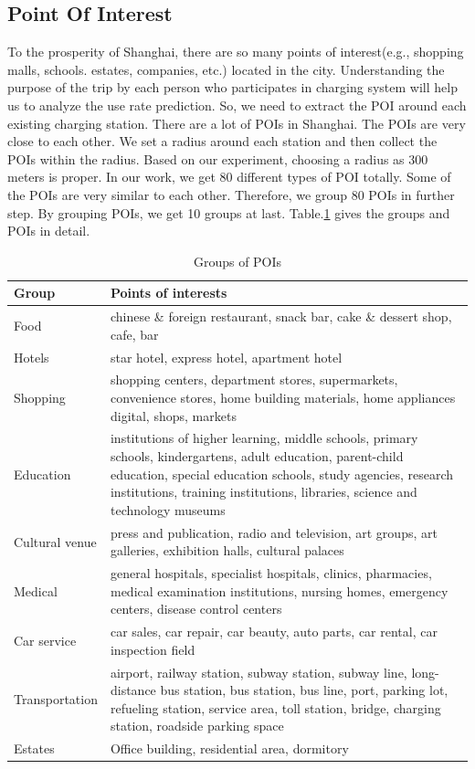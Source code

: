 \documentclass[conference]{IEEEtran}
\begin{document}
\subsection{Point Of Interest}
To the prosperity of Shanghai, there are so many points of interest(e.g., shopping malls, schools. estates, companies, etc.) located in the city.  Understanding the purpose of the trip by each person who participates in charging system will help us to analyze the use rate prediction. So, we need to extract the POI around each existing charging station. There are a lot of POIs in Shanghai. The POIs are very close to each other. We set a radius around each station and then collect the POIs within the radius. Based on our experiment, choosing a radius as 300 meters is proper. In our work, we get 80 different types of POI totally. Some of the POIs are very similar to each other. Therefore, we group 80 POIs in further step. By grouping POIs, we get 10 groups at last. Table.\ref{tab1} gives the groups and POIs in detail.

\begin{table}[htbp]
	\caption{Groups of POIs}
	\begin{center}
		\begin{tabular}{|l|p{6cm}|}
			\hline
			Group & Points of interests\\
			\hline
			Food & chinese \& foreign restaurant, snack bar, cake \& dessert shop, cafe, bar\\
			\hline
			Hotels & star hotel, express hotel, apartment hotel\\
			\hline
			Shopping & shopping centers, department stores, supermarkets, convenience stores, home building materials, home appliances digital, shops, markets\\
			\hline
			Education & institutions of higher learning, middle schools, primary schools, kindergartens, adult education, parent-child education, special education schools, study agencies, research institutions, training institutions, libraries, science and technology museums\\
			\hline
			Cultural venue & press and publication, radio and television, art groups, art galleries, exhibition halls, cultural palaces\\
			\hline
			Medical & general hospitals, specialist hospitals, clinics, pharmacies, medical examination institutions, nursing homes, emergency centers, disease control centers\\
			\hline
			Car service & car sales, car repair, car beauty, auto parts, car rental, car inspection field\\
			\hline
			Transportation & airport, railway station, subway station, subway line, long-distance bus station, bus station, bus line, port, parking lot, refueling station, service area, toll station, bridge, charging station, roadside parking space\\
			\hline
			Estates & Office building, residential area, dormitory\\
			\hline
		\end{tabular}
		\label{tab1}
	\end{center}
\end{table}
\end{document}
